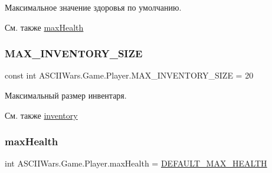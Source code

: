 Максимальное значение здоровья по умолчанию. 

\begin{DoxySeeAlso}{См. также}
\hyperlink{class_a_s_c_i_i_wars_1_1_game_1_1_player_acfd121f865f0e5a87f177e93c82feadc}{max\+Health} 
\end{DoxySeeAlso}
\hypertarget{class_a_s_c_i_i_wars_1_1_game_1_1_player_a1cc8a05398a717bcf8c5a0ebd2ea0747}{}\label{class_a_s_c_i_i_wars_1_1_game_1_1_player_a1cc8a05398a717bcf8c5a0ebd2ea0747} 
\subsubsection{\texorpdfstring{M\+A\+X\+\_\+\+I\+N\+V\+E\+N\+T\+O\+R\+Y\+\_\+\+S\+I\+ZE}{MAX\_INVENTORY\_SIZE}}
{\footnotesize\ttfamily const int A\+S\+C\+I\+I\+Wars.\+Game.\+Player.\+M\+A\+X\+\_\+\+I\+N\+V\+E\+N\+T\+O\+R\+Y\+\_\+\+S\+I\+ZE = 20}



Максимальный размер инвентаря. 

\begin{DoxySeeAlso}{См. также}
\hyperlink{class_a_s_c_i_i_wars_1_1_game_1_1_player_a04acfaa196162f89bfae7aee5ec45480}{inventory} 
\end{DoxySeeAlso}
\hypertarget{class_a_s_c_i_i_wars_1_1_game_1_1_player_acfd121f865f0e5a87f177e93c82feadc}{}\label{class_a_s_c_i_i_wars_1_1_game_1_1_player_acfd121f865f0e5a87f177e93c82feadc} 
\subsubsection{\texorpdfstring{max\+Health}{maxHealth}}
{\footnotesize\ttfamily int A\+S\+C\+I\+I\+Wars.\+Game.\+Player.\+max\+Health = \hyperlink{class_a_s_c_i_i_wars_1_1_game_1_1_player_ab5921985db319187e317563c15ef48dc}{D\+E\+F\+A\+U\+L\+T\+\_\+\+M\+A\+X\+\_\+\+H\+E\+A\+L\+TH}}



